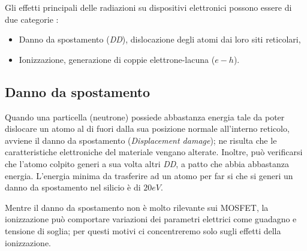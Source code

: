 
Gli effetti principali delle radiazioni su dispositivi elettronici possono essere di due categorie \cite{bib:Effetti_Radiazioni_1987}:
\begin{itemize}
	\item Danno da spostamento {(\textit{DD})}, dislocazione degli atomi dai loro siti reticolari,
	\item Ionizzazione, generazione di coppie elettrone-lacuna ($e-h$).
\end{itemize}

\subsection{Danno da spostamento}
Quando una particella (neutrone) possiede abbastanza energia tale da poter dislocare un atomo al di fuori dalla sua posizione normale all'interno reticolo, avviene il danno da spostamento (\textit{Displacement damage}); ne risulta che le caratteristiche elettroniche del materiale vengano alterate.
Inoltre, può verificarsi che l'atomo colpito generi a sua volta altri \textit{DD}, a patto che abbia abbastanza energia. L'energia minima da trasferire ad un atomo per far si che si generi un danno da spostamento nel silicio è di $20 eV$.


\vspace*{0.5cm}

Mentre il danno da spostamento non è molto rilevante sui MOSFET, la ionizzazione può comportare variazioni dei parametri elettrici come guadagno e tensione di soglia; per questi motivi ci concentreremo solo sugli effetti della ionizzazione.

 

